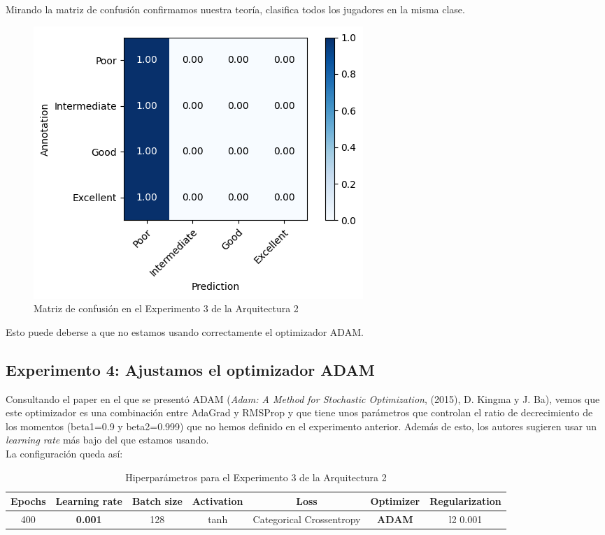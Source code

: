 \documentclass{article}
\begin{document}
			Mirando la matriz de confusi\'on confirmamos nuestra teor\'ia, clasifica todos los jugadores en la misma clase.
			\begin{figure}[!h]
				\begin{center}
					\includegraphics[scale=0.7]{cm-a2-e3.png}		
					\caption{Matriz de confusi\'on en el Experimento 3 de la Arquitectura 2}	
					\label{cm-a2-e3}
				\end{center}
			\end{figure}
			
			Esto puede deberse a que no estamos usando correctamente el optimizador ADAM.
			
			
		\subsection{Experimento 4: Ajustamos el optimizador ADAM}
			Consultando el paper en el que se present\'o ADAM (\textit{Adam: A Method for Stochastic Optimization}, (2015), D. Kingma y J. Ba), vemos que este optimizador es una combinaci\'on entre AdaGrad y RMSProp y que tiene unos par\'ametros que controlan el ratio de decrecimiento de los momentos (beta1=0.9 y beta2=0.999) que no hemos definido en el experimento anterior. Adem\'as de esto, los autores sugieren usar un \textit{learning rate} m\'as bajo del que estamos usando.\\
			
			La configuraci\'on queda as\'i:
			\begin{table}[!h]
				\begin{center}
					\begin{tabular}{| c | c | c | c | c | c | c |}
						\textbf{Epochs} & \textbf{Learning rate} & \textbf{Batch size} & \textbf{Activation} & \textbf{Loss} & \textbf{Optimizer} & \textbf{Regularization} \\ \hline
						400 & \textbf{0.001} & 128 & tanh & Categorical Crossentropy & \textbf{ADAM} & l2 0.001
					\end{tabular}
					\caption{Hiperpar\'ametros para el Experimento 3 de la Arquitectura 2}
					\label{tab:hip-a2-e3}
				\end{center}
			\end{table}
			
			
\end{document}
